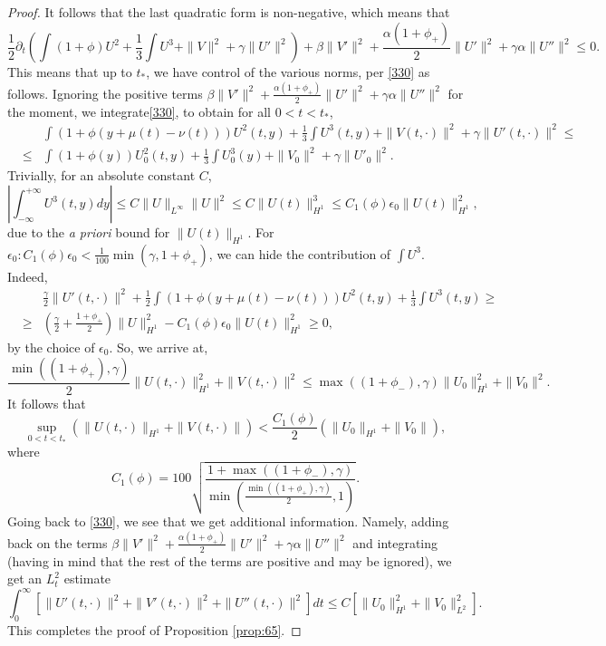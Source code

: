\documentclass[12pt]{amsart}
\theoremstyle{definition}
\theoremstyle{remark}
\numberwithin{equation}{section}
\renewcommand{\(}{\left(}
\renewcommand{\)}{\right)}
\renewcommand{\[}{\left[}
\renewcommand{\]}{\right]}
\newcommand{\f}[2]{\frac{#1}{#2}}
\newcommand{\al}{\alpha}
\newcommand{\be}{\beta}
\newcommand{\ga}{\gamma}
\newcommand{\eps}{\epsilon}
\newcommand{\p}{\partial}
\begin{document}
\begin{proof}
It follows that the last quadratic form is non-negative, which means that 
\begin{equation}
	\label{330} 
	\f{1}{2} \p_t\left( \int (1+ \phi) U^2+\f{1}{3} \int U^3+\|V\|^2+ \ga \|U'\|^2 \right) +  \be\|V'\|^2 +\f{\al(1+\phi_+)}{2} \|U'\|^2+  \ga \al \|U''\|^2\leq 0.
\end{equation}
This means that up to  $t_*$, we have control of the various norms, per \eqref{330} as follows. Ignoring the positive terms $ \be\|V'\|^2 +\f{\al(1+\phi_+)}{2} \|U'\|^2+  \ga \al \|U''\|^2$ for the moment, we  integrate\eqref{330}, to obtain for all $0<t<t_*$, 
\begin{eqnarray*}
& & 	 \int  (1+\phi(y+\mu(t)-\nu(t)) ) U^2(t, y)+\f{1}{3} \int U^3(t,y)+\|V(t,\cdot)\|^2+ \ga \|U'(t,\cdot)\|^2 \leq \\
	 &\leq &  \int  (1+\phi(y))  U_0^2(t, y)+\f{1}{3} \int U_0^3(y)+\|V_0\|^2+ \ga \|U'_0\|^2. 
\end{eqnarray*}
Trivially, for an absolute constant $C$, 
$$
|\int_{-\infty}^{+\infty}  U^3(t,y) dy|\leq C \|U\|_{L^\infty} \|U\|^2\leq C \|U(t)\|_{H^1}^3\leq C_1(\phi) \eps_0 \|U(t)\|_{H^1}^2, 
$$
due to the {\it a priori} bound for $\|U(t)\|_{H^1}$. 
For $\eps_0: C_1(\phi)\eps_0<\f{1}{100} \min(\ga, 1+\phi_+)$, we can hide the contribution of $\int U^3$. Indeed, 
\begin{eqnarray*}
	& & \f{\ga}{2} \|U'(t,\cdot)\|^2+  \f{1}{2} \int  (1+\phi(y+\mu(t)-\nu(t)) ) U^2(t, y) + \f{1}{3} \int U^3(t,y)\geq \\
	&\geq & \left(\f{\ga}{2}+\f{1+\phi_+}{2}\right) \|U\|_{H^1}^2 - C_1(\phi) \eps_0 \|U(t)\|_{H^1}^2\geq 0, 
\end{eqnarray*}
by the choice of $\eps_0$. So, we arrive at, 
\begin{equation}
	\label{414} 
	\f{\min((1+\phi_+), \ga)}{2} \|U(t, \cdot)\|_{H^1}^2 + \|V(t,\cdot)\|^2 \leq 	\max((1+\phi_-),\ga)  \|U_0\|_{H^1}^2+\|V_0\|^2. 
\end{equation}
It follows that 
\begin{equation}
	\label{418} 
	\sup_{0<t<t_*} (\|U(t, \cdot)\|_{H^1}+\|V(t,\cdot)\|)< \f{C_1(\phi)}{2}( \|U_0\|_{H^1}+\|V_0\|),
\end{equation}
where 
\begin{equation}
	\label{419} 
C_1(\phi)=100\sqrt{ \f{1+\max((1+\phi_-),\ga)}{\min(\f{\min((1+\phi_+), \ga)}{2},1)}}. 
\end{equation}
  Going back to \eqref{330}, we see that we get additional information. Namely, adding back on the terms $\be\|V'\|^2 +\f{\al(1+\phi_+)}{2} \|U'\|^2+  \ga \al \|U''\|^2$ and integrating (having in mind that the rest of the terms are positive and may be ignored), we get an $L^2_t$ estimate 
\begin{equation}
	\label{360} 
	\int_0^{\infty} [\|U'(t, \cdot)\|^2+\|V'(t, \cdot)\|^2 + \|U''(t,\cdot)\|^2] dt\leq C  [\|U_0\|_{H^1}^2 +
	\|V_0\|_{L^2}^2].
\end{equation}
This completes the proof of Proposition \ref{prop:65}. 
\end{proof}
\end{document}
